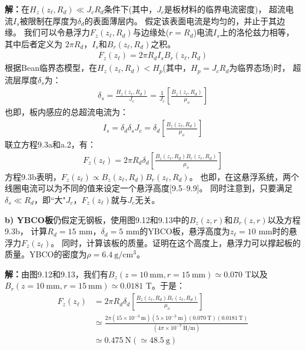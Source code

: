 \textbf{解：}在$H_z(z_\ell,R_d)\ll J_c R_d$条件下(其中，$J_c$是板材料的临界电流密度)，
超流电流$I_s$被限制在厚度为$\delta_d$的表面薄层内。
假定该表面电流是均匀的，并止于其边缘。
我们可以令悬浮力$F_z(z_\ell,R_d)$与边缘处($r=R_d$)电流$I_s$上的洛伦兹力相等，其中后者定义为
$2\pi R_d，I_s$和$B_r(z_\ell,R_d)$之积。
\begin{align*}%
F_{z}(z_{\ell})=2\pi R_{d}I_{s}B_{r}(z_{\ell},R_{d})\tag{9.3a}
\end{align*}
根据Bean临界态模型，在$H_z(z_\ell,R_d)<H_p$(其中，$H_p=J_c R_d$为临界态场)时，
超流层厚度$\delta_{s}$为：
\begin{align*}%
\delta_{s}=\frac{H_{z}(z_{\ell},R_{d})}{J_{c}}=\frac{1}{J_{c}}[\frac{B_{z}(z_{\ell},R_{d})}{\mu_{o}}]\tag{a.1}
\end{align*}
也即，板内感应的总超流电流为：
\begin{align*}%
I_{s}=\delta_{d}\delta_{s}J_{c}=\delta_{d}[\frac{B_{z}(z_{\ell},R_{d})}{\mu_{o}}]\tag{a.2}
\end{align*}
联立方程9.3a和a.2，有：
\begin{align*}%
F_{z}(z_{\ell})=2\pi R_{d}\delta_{d}[\frac{B_{z}(z_{\ell},R_{d})B_{r}(z_{\ell},R_{d})}{\mu_{o}}]\tag{9.3b}
\end{align*}
方程9.3b表明，$F_z(z_\ell)\propto B_z(z_\ell,R_d)B_r(z_\ell,R_d)$。
也即，在这悬浮系统，两个线圈电流可以为不同的值来设定一个悬浮高度[9.5--9.9]。
同时注意到，只要满足$\delta_{s}\ll R_d$，即``大"$J_c$，$F_z(z_\ell)$就与$J_c$无关。

\textbf{b) YBCO板}\qquad 仍假定无钢板，使用图9.12和9.13中的$B_z(z,r)$和$B_r(z,r)$以及方程9.3b，
计算$R_d=15$ mm，$\delta_d=5$ mm的YBCO板，悬浮高度为$z_\ell=10$ mm时的悬浮力$F_z(z_\ell)$。
同时，计算该板的质量。证明在这个高度上，悬浮力可以撑起板的质量。YBCO的密度为$\rho=6.4\ \mathrm{g/cm^3}$。

\textbf{解：}由图9.12和9.13，我们有$B_z(z=10\ \mathrm{mm},r=15\ \mathrm{mm})\simeq 0.070$ T以及
$B_r(z=10\ \mathrm{mm},r=15\ \mathrm{mm})\simeq 0.0181$ T。于是：
\begin{align*}%
F_{z}(z_{\ell})&=2\pi R_{d}\delta_{d}[\frac{B_{z}(z_{\ell},R_{d})B_{r}(z_{\ell},R_{d})}{\mu_{o}}]\\ \tag{9.3b}
&\simeq\frac{2\pi(15\times 10^{-3}\ \mathrm{m})(5\times 10^{-3}\ \mathrm{m})(0.070\ \mathrm{T})(0.0181\ \mathrm{T})}{(4\pi\times 10^{-7}\ \mathrm{H/m})}\\
&\simeq 0.475\ \mathrm{N}(\simeq 48.5\ \mathrm{g})
\end{align*}

